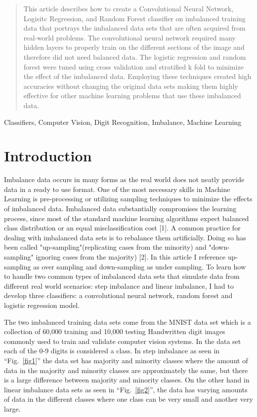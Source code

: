 \documentclass[Dealing with Imbalance in Computer Vision]{IEEEtran}
\begin{document}
\begin{abstract}
This article describes how to create a Convolutional Neural Network, Logisitc Regression, and Random Forest classifier on imbalanced training data that portrays the imbalanced data sets that are often acquired from real-world problems. The convolutional neural network  required many hidden layers to properly train on the different sections of the image and therefore did not need balanced data. The logistic regression and random forest were tuned using cross validation and stratified k fold to minimize the effect of the imbalanced data. Employing these techniques created high accuracies without changing the original data sets making them highly effective for other machine learning problems that use these imbalanced data.
\end{abstract}

\begin{IEEEkeywords}
Classifiers, Computer Vision, Digit Recognition, Imbalance, Machine Learning
\end{IEEEkeywords}

\section{Introduction}
Imbalance data occurs in many forms as the real world does not neatly provide data in a ready to use format. One of the most necessary skills in Machine Learning is  pre-processing or utilizing sampling techniques to minimize the effects of imbalanced data. Imbalanced data substantially compromises the learning process, since most of the standard machine learning algorithms expect balanced class distribution or an equal misclassification cost [1].  A common practice for dealing with imbalanced data sets is to rebalance them artificially. Doing so has been called "up-sampling"(replicating cases from the minority)   and "down-sampling" ignoring  cases  from  the  majority) [2]. In this article I reference up-sampling as over sampling and down-sampling as under sampling. To learn how to handle two common types of imbalanced data sets that simulate data from different real world scenarios: step imbalance and linear imbalance, I had to develop three classifiers: a convolutional neural network, random forest and logistic regression model.

The two imbalanced training data sets come from the MNIST data set which is a collection of 60,000 training and 10,000 testing Handwritten digit images commonly used to train and validate computer vision systems. In the data set each of the 0-9 digits is considered a class. In step imbalance as seen in ``Fig.~\ref{fig1}'' the data set has majority and minority classes where the amount of data in the majority and minority classes are approximately the same, but there is a large difference between majority and minority classes. On the other hand in linear imbalance data sets as seen in ``Fig.~\ref{fig2}'', the data has varying amounts of data in the different classes where one class can be very small and another very large.
\end{document}
